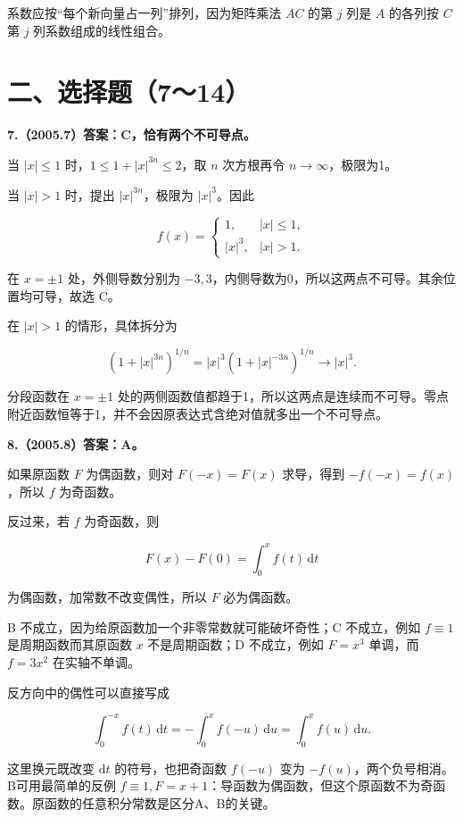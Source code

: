 \documentclass[UTF8,11pt,fontset=windows]{ctexart}
\begin{document}
系数应按“每个新向量占一列”排列，因为矩阵乘法 $AC$ 的第 $j$ 列是 $A$ 的各列按 $C$ 第 $j$ 列系数组成的线性组合。

\clearpage

\section*{二、选择题（7～14）}

\textbf{7.（2005.7）答案：C，恰有两个不可导点。}

当 $|x|\le1$ 时，$1\le1+|x|^{3n}\le2$，取 $n$ 次方根再令 $n\to\infty$，极限为1。

当 $|x|>1$ 时，提出 $|x|^{3n}$，极限为 $|x|^3$。因此

$$
f(x)=\begin{cases}1,&|x|\le1,\\|x|^3,&|x|>1.\end{cases}
$$

在 $x=\pm1$ 处，外侧导数分别为 $-3,3$，内侧导数为0，所以这两点不可导。其余位置均可导，故选 C。

在 $|x|>1$ 的情形，具体拆分为

$$
(1+|x|^{3n})^{1/n}
=|x|^3(1+|x|^{-3n})^{1/n}\longrightarrow|x|^3.
$$

分段函数在 $x=\pm1$ 处的两侧函数值都趋于1，所以这两点是连续而不可导。零点附近函数恒等于1，并不会因原表达式含绝对值就多出一个不可导点。

\clearpage

\textbf{8.（2005.8）答案：A。}

如果原函数 $F$ 为偶函数，则对 $F(-x)=F(x)$ 求导，得到 $-f(-x)=f(x)$，所以 $f$ 为奇函数。

反过来，若 $f$ 为奇函数，则

$$
F(x)-F(0)=\int_0^x f(t)\,\mathrm dt
$$

为偶函数，加常数不改变偶性，所以 $F$ 必为偶函数。

B 不成立，因为给原函数加一个非零常数就可能破坏奇性；C 不成立，例如 $f\equiv1$ 是周期函数而其原函数 $x$ 不是周期函数；D 不成立，例如 $F=x^3$ 单调，而 $f=3x^2$ 在实轴不单调。

反方向中的偶性可以直接写成

$$
\int_0^{-x}f(t)\,\mathrm dt
=-\int_0^xf(-u)\,\mathrm du
=\int_0^xf(u)\,\mathrm du.
$$

这里换元既改变 $\mathrm dt$ 的符号，也把奇函数 $f(-u)$ 变为 $-f(u)$，两个负号相消。B可用最简单的反例 $f\equiv1,F=x+1$：导函数为偶函数，但这个原函数不为奇函数。原函数的任意积分常数是区分A、B的关键。
\end{document}
